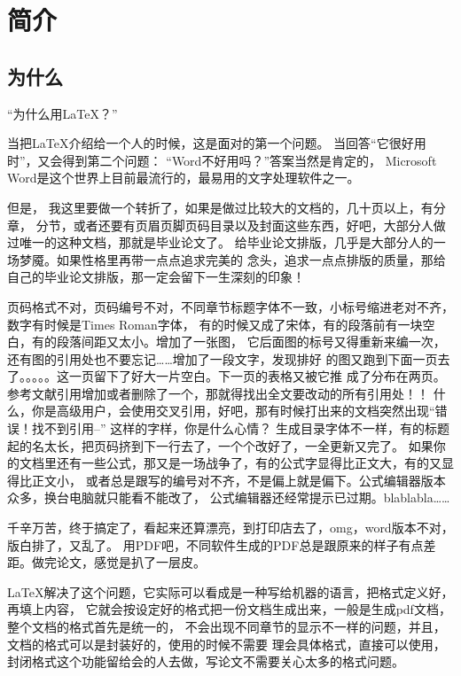\chapter{简介}

\section{为什么}

“为什么用\LaTeX{}{}？”

当把\LaTeX{}{}介绍给一个人的时候，这是面对的第一个问题。
当回答“它很好用时”，又会得到第二个问题：
“Word不好用吗？”答案当然是肯定的，
Microsoft Word是这个世界上目前最流行的，最易用的文字处理软件之一。

但是，
我这里要做一个转折了，如果是做过比较大的文档的，几十页以上，有分章，
分节，或者还要有页眉页脚页码目录以及封面这些东西，好吧，大部分人做过唯一的这种文档，那就是毕业论文了。
给毕业论文排版，几乎是大部分人的一场梦魇。如果性格里再带一点点追求完美的
念头，追求一点点排版的质量，那给自己的毕业论文排版，那一定会留下一生深刻的印象！

页码格式不对，页码编号不对，不同章节标题字体不一致，小标号缩进老对不齐，
数字有时候是Times Roman字体，
有的时候又成了宋体，有的段落前有一块空白，有的段落间距又太小。增加了一张图，
它后面图的标号又得重新来编一次，还有图的引用处也不要忘记……增加了一段文字，发现排好
的图又跑到下面一页去了。。。。。这一页留下了好大一片空白。下一页的表格又被它推
成了分布在两页。参考文献引用增加或者删除了一个，那就得找出全文要改动的所有引用处！！
什么，你是高级用户，会使用交叉引用，好吧，那有时候打出来的文档突然出现“错误！找不到引用--”
这样的字样，你是什么心情？
生成目录字体不一样，有的标题起的名太长，把页码挤到下一行去了，一个个改好了，一全更新又完了。
如果你的文档里还有一些公式，那又是一场战争了，有的公式字显得比正文大，有的又显得比正文小，
或者总是跟写的编号对不齐，不是偏上就是偏下。公式编辑器版本众多，换台电脑就只能看不能改了，
公式编辑器还经常提示已过期。blablabla……

千辛万苦，终于搞定了，看起来还算漂亮，到打印店去了，omg，word版本不对，版白排了，又乱了。
用PDF吧，不同软件生成的PDF总是跟原来的样子有点差距。做完论文，感觉是扒了一层皮。

\LaTeX{}解决了这个问题，它实际可以看成是一种写给机器的语言，把格式定义好，再填上内容，
它就会按设定好的格式把一份文档生成出来，一般是生成pdf文档，整个文档的格式首先是统一的，
不会出现不同章节的显示不一样的问题，并且，文档的格式可以是封装好的，使用的时候不需要
理会具体格式，直接可以使用，封闭格式这个功能留给会的人去做，写论文不需要关心太多的格式问题。

